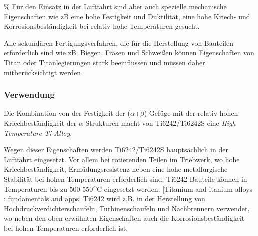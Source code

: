 \%	Für den Einsatz in der Luftfahrt sind aber auch spezielle mechanische  Eigenschaften wie zB eine hohe Festigkeit und Duktilität, eine hohe Kriech- und Korrosionsbeständigkeit bei relativ hohe Temperaturen gesucht.   

Alle sekundären Fertigungsverfahren, die für die Herstellung von Bauteilen erforderlich sind   wie zB. Biegen, Fräsen und Schweißen können Eigenschaften von Titan oder Titanlegierungen stark beeinflussen  und müssen daher mitberücksichtigt werden.




\subsubsection{Verwendung}


Die Kombination von der Festigkeit der ($\alpha$+$\beta$)-Gefüge mit der relativ hohen Kriechbeständigkeit der $\alpha$-Strukturen macht von Ti6242/Ti6242S eine \textit{High Temperature Ti-Alloy}.

Wegen dieser Eigenschaften werden Ti6242/Ti6242S hauptsächlich in der Luftfahrt eingesetzt. Vor allem bei rotierenden Teilen im Triebwerk, wo  hohe Kriechbeständigkeit, Ermüdungsresistenz  neben eine hohe metallurgische Stabilität bei hohen Temperaturen erforderlich sind. 
Ti6242-Bauteile können in Temperaturen bis zu 500-550^\circ C eingesetzt werden. [Titanium and itanium alloys : fundamentals and apps]
Ti6242 wird z.B. in der Herstellung von Hochdruckverdichterschaufeln, Turbinenschaufeln und Nachbrennern verwendet, wo neben den oben erwähnten Eigenschaften auch die Korrosionsbeständigkeit bei hohen Temperaturen erforderlich ist. \newline



